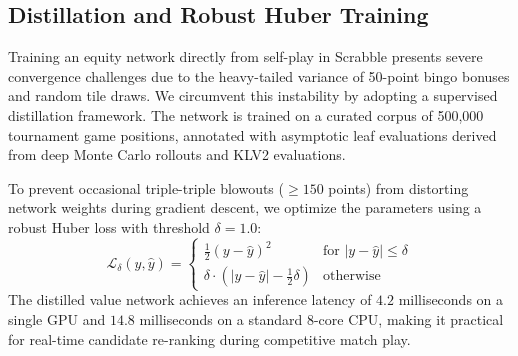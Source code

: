\subsection{Distillation and Robust Huber Training}

Training an equity network directly from self-play in Scrabble presents severe convergence challenges due to the heavy-tailed variance of 50-point bingo bonuses and random tile draws. We circumvent this instability by adopting a supervised distillation framework. The network is trained on a curated corpus of 500,000 tournament game positions, annotated with asymptotic leaf evaluations derived from deep Monte Carlo rollouts and KLV2 evaluations.

To prevent occasional triple-triple blowouts ($\ge 150$ points) from distorting network weights during gradient descent, we optimize the parameters using a robust Huber loss with threshold $\delta = 1.0$:
\begin{equation}
    \mathcal{L}_\delta(y, \hat{y}) = \begin{cases}
        \frac{1}{2} (y - \hat{y})^2 & \text{for } |y - \hat{y}| \le \delta \\
        \delta \cdot (|y - \hat{y}| - \frac{1}{2} \delta) & \text{otherwise}
    \end{cases}
\end{equation}
The distilled value network achieves an inference latency of $4.2$ milliseconds on a single GPU and $14.8$ milliseconds on a standard 8-core CPU, making it practical for real-time candidate re-ranking during competitive match play.
